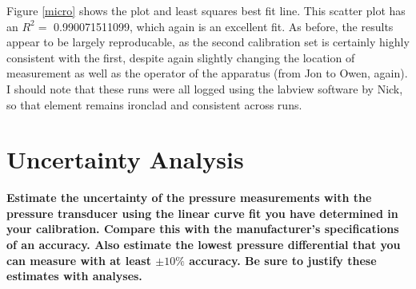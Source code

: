 \documentclass{article}
\begin{document}
Figure \ref{micro} shows the plot and least squares best fit line. 
This scatter plot has an $R^2 =$ 0.990071511099, which again is an
excellent fit. As before, the results appear to be largely reproducable,
as the second calibration set is certainly highly consistent with the
first, despite again slightly changing the location of measurement as
well as the operator of the apparatus (from Jon to Owen, again). I
should note that these runs were all logged using the labview software
by Nick, so that element remains ironclad and consistent across runs. 

\newpage
\section{Uncertainty Analysis}

\textbf{Estimate the uncertainty of the pressure measurements with the
pressure transducer using the linear curve fit you have determined in
your calibration. Compare this with the manufacturer's specifications of
an accuracy. Also estimate the lowest pressure differential that you can
measure with at least $\pm 10\%$ accuracy. Be sure to justify these
estimates with analyses.}
\end{document}

